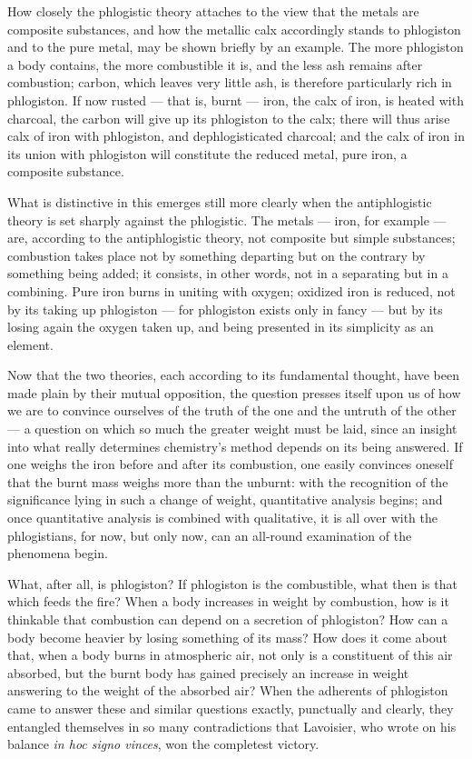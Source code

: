 \documentclass[12pt,a4paper]{book}
\begin{document}
How closely the phlogistic theory attaches to the view that the metals are
composite substances, and how the metallic calx accordingly stands to
phlogiston and to the pure metal, may be shown briefly by an example. The more
phlogiston a body contains, the more combustible it is, and the less ash
remains after combustion; carbon, which leaves very little ash, is therefore
particularly rich in phlogiston. If now rusted --- that is, burnt --- iron, the
calx of iron, is heated with charcoal, the carbon will give up its phlogiston
to the calx; there will thus arise calx of iron with phlogiston, and
dephlogisticated charcoal; and the calx of iron in its union with phlogiston
will constitute the reduced metal, pure iron, a composite substance.

What is distinctive in this emerges still more clearly when the antiphlogistic
theory is set sharply against the phlogistic. The metals --- iron, for example
--- are, according to the antiphlogistic theory, not composite but simple
substances; combustion takes place not by something departing but on the
contrary by something being added; it consists, in other words, not in a
separating but in a combining. Pure iron burns in uniting with oxygen; oxidized
iron is reduced, not by its taking up phlogiston --- for phlogiston exists only
in fancy --- but by its losing again the oxygen taken up, and being presented
in its simplicity as an element.

Now that the two theories, each according to its fundamental thought, have been
made plain by their mutual opposition, the question presses itself upon us of
how we are to convince ourselves of the truth of the one and the untruth of the
other --- a question on which so much the greater weight must be laid, since an
insight into what really determines chemistry's method depends on its being
answered. If one weighs the iron before and after its combustion, one easily
convinces oneself that the burnt mass weighs more than the unburnt: with the
recognition of the significance lying in such a change of weight, quantitative
analysis begins; and once quantitative analysis is combined with qualitative,
it is all over with the phlogistians, for now, but only now, can an all-round
examination of the phenomena begin.

What, after all, is phlogiston? If phlogiston is the combustible, what then is
that which feeds the fire? When a body increases in weight by combustion, how
is it thinkable that combustion can depend on a secretion of phlogiston? How
can a
\setcounter{footnote}{0}
body become heavier by losing something of its mass? How does it come about
that, when a body burns in atmospheric air, not only is a constituent of this
air absorbed, but the burnt body has gained precisely an increase in weight
answering to the weight of the absorbed air? When the adherents of phlogiston
came to answer these and similar questions exactly, punctually and clearly,
they entangled themselves in so many contradictions that Lavoisier, who wrote
on his balance \textit{in hoc signo vinces}, won the completest victory.
\end{document}
